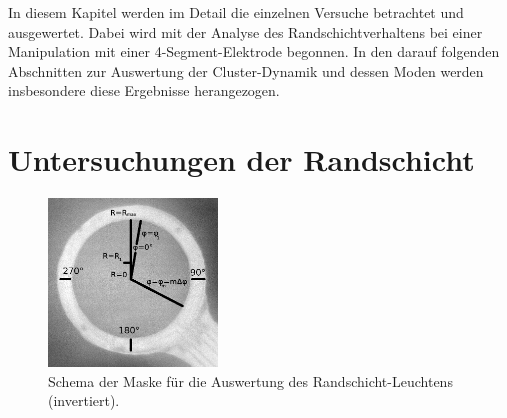 \documentclass[numbers=noenddot,a4paper,notitlepage,twoside,BCOR15mm]{scrbook}
\begin{document}
		In diesem Kapitel werden im Detail die einzelnen Versuche betrachtet und ausgewertet. Dabei wird mit der Analyse des Randschichtverhaltens bei einer Manipulation mit einer 4-Segment-Elektrode begonnen. In den darauf folgenden Abschnitten zur Auswertung der Cluster-Dynamik und dessen Moden werden insbesondere diese Ergebnisse herangezogen.

        \section{Untersuchungen der Randschicht}\label{sub:glowanalys}

                \begin{figure}
                    \centering
                    \includegraphics[width=0.4\textwidth,height=0.4\textwidth]{figs/auswertung/plasmaglw/randanalysemaske.png}
                    \caption{Schema der Maske für die Auswertung des Randschicht-Leuchtens (invertiert).}
                    \label{img:randmaske}
                \end{figure}
\end{document}

